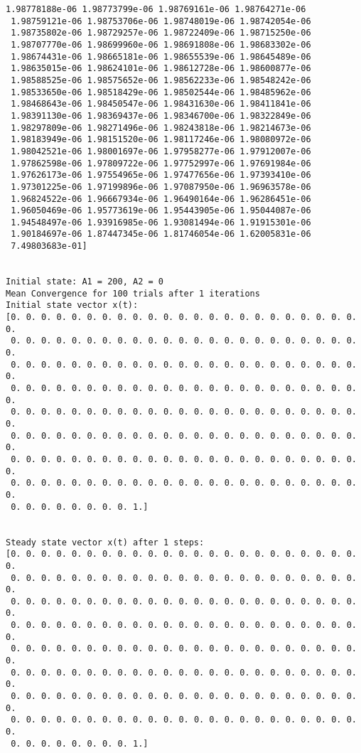 \documentclass[11pt]{article}
\begin{document}
\begin{Verbatim}[commandchars=\\\{\}]
 1.98778188e-06 1.98773799e-06 1.98769161e-06 1.98764271e-06
 1.98759121e-06 1.98753706e-06 1.98748019e-06 1.98742054e-06
 1.98735802e-06 1.98729257e-06 1.98722409e-06 1.98715250e-06
 1.98707770e-06 1.98699960e-06 1.98691808e-06 1.98683302e-06
 1.98674431e-06 1.98665181e-06 1.98655539e-06 1.98645489e-06
 1.98635015e-06 1.98624101e-06 1.98612728e-06 1.98600877e-06
 1.98588525e-06 1.98575652e-06 1.98562233e-06 1.98548242e-06
 1.98533650e-06 1.98518429e-06 1.98502544e-06 1.98485962e-06
 1.98468643e-06 1.98450547e-06 1.98431630e-06 1.98411841e-06
 1.98391130e-06 1.98369437e-06 1.98346700e-06 1.98322849e-06
 1.98297809e-06 1.98271496e-06 1.98243818e-06 1.98214673e-06
 1.98183949e-06 1.98151520e-06 1.98117246e-06 1.98080972e-06
 1.98042521e-06 1.98001697e-06 1.97958277e-06 1.97912007e-06
 1.97862598e-06 1.97809722e-06 1.97752997e-06 1.97691984e-06
 1.97626173e-06 1.97554965e-06 1.97477656e-06 1.97393410e-06
 1.97301225e-06 1.97199896e-06 1.97087950e-06 1.96963578e-06
 1.96824522e-06 1.96667934e-06 1.96490164e-06 1.96286451e-06
 1.96050469e-06 1.95773619e-06 1.95443905e-06 1.95044087e-06
 1.94548497e-06 1.93916985e-06 1.93081494e-06 1.91915301e-06
 1.90184697e-06 1.87447345e-06 1.81746054e-06 1.62005831e-06
 7.49803683e-01]


Initial state: A1 = 200, A2 = 0
Mean Convergence for 100 trials after 1 iterations
Initial state vector x(t):
[0. 0. 0. 0. 0. 0. 0. 0. 0. 0. 0. 0. 0. 0. 0. 0. 0. 0. 0. 0. 0. 0. 0. 0.
 0. 0. 0. 0. 0. 0. 0. 0. 0. 0. 0. 0. 0. 0. 0. 0. 0. 0. 0. 0. 0. 0. 0. 0.
 0. 0. 0. 0. 0. 0. 0. 0. 0. 0. 0. 0. 0. 0. 0. 0. 0. 0. 0. 0. 0. 0. 0. 0.
 0. 0. 0. 0. 0. 0. 0. 0. 0. 0. 0. 0. 0. 0. 0. 0. 0. 0. 0. 0. 0. 0. 0. 0.
 0. 0. 0. 0. 0. 0. 0. 0. 0. 0. 0. 0. 0. 0. 0. 0. 0. 0. 0. 0. 0. 0. 0. 0.
 0. 0. 0. 0. 0. 0. 0. 0. 0. 0. 0. 0. 0. 0. 0. 0. 0. 0. 0. 0. 0. 0. 0. 0.
 0. 0. 0. 0. 0. 0. 0. 0. 0. 0. 0. 0. 0. 0. 0. 0. 0. 0. 0. 0. 0. 0. 0. 0.
 0. 0. 0. 0. 0. 0. 0. 0. 0. 0. 0. 0. 0. 0. 0. 0. 0. 0. 0. 0. 0. 0. 0. 0.
 0. 0. 0. 0. 0. 0. 0. 0. 1.]


Steady state vector x(t) after 1 steps:
[0. 0. 0. 0. 0. 0. 0. 0. 0. 0. 0. 0. 0. 0. 0. 0. 0. 0. 0. 0. 0. 0. 0. 0.
 0. 0. 0. 0. 0. 0. 0. 0. 0. 0. 0. 0. 0. 0. 0. 0. 0. 0. 0. 0. 0. 0. 0. 0.
 0. 0. 0. 0. 0. 0. 0. 0. 0. 0. 0. 0. 0. 0. 0. 0. 0. 0. 0. 0. 0. 0. 0. 0.
 0. 0. 0. 0. 0. 0. 0. 0. 0. 0. 0. 0. 0. 0. 0. 0. 0. 0. 0. 0. 0. 0. 0. 0.
 0. 0. 0. 0. 0. 0. 0. 0. 0. 0. 0. 0. 0. 0. 0. 0. 0. 0. 0. 0. 0. 0. 0. 0.
 0. 0. 0. 0. 0. 0. 0. 0. 0. 0. 0. 0. 0. 0. 0. 0. 0. 0. 0. 0. 0. 0. 0. 0.
 0. 0. 0. 0. 0. 0. 0. 0. 0. 0. 0. 0. 0. 0. 0. 0. 0. 0. 0. 0. 0. 0. 0. 0.
 0. 0. 0. 0. 0. 0. 0. 0. 0. 0. 0. 0. 0. 0. 0. 0. 0. 0. 0. 0. 0. 0. 0. 0.
 0. 0. 0. 0. 0. 0. 0. 0. 1.]


    \end{Verbatim}
\end{document}
